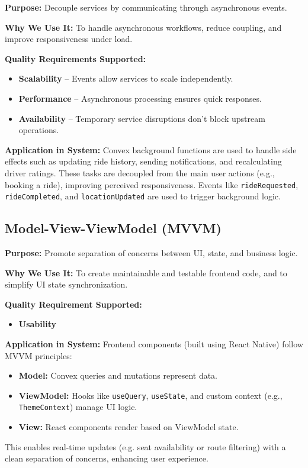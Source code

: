 \documentclass[12pt]{article}
\begin{document}
\textbf{Purpose:} Decouple services by communicating through asynchronous events.

\textbf{Why We Use It:} To handle asynchronous workflows, reduce coupling, and improve responsiveness under load.

\textbf{Quality Requirements Supported:}
\begin{itemize}
  \item \textbf{Scalability} – Events allow services to scale independently.
  \item \textbf{Performance} – Asynchronous processing ensures quick responses.
  \item \textbf{Availability} – Temporary service disruptions don't block upstream operations.
\end{itemize}

\textbf{Application in System:}  
Convex background functions are used to handle side effects such as updating ride history, sending notifications, and recalculating driver ratings. These tasks are decoupled from the main user actions (e.g., booking a ride), improving perceived responsiveness. Events like \texttt{rideRequested}, \texttt{rideCompleted}, and \texttt{locationUpdated} are used to trigger background logic.

\subsection{Model-View-ViewModel (MVVM)}

\textbf{Purpose:} Promote separation of concerns between UI, state, and business logic.

\textbf{Why We Use It:} To create maintainable and testable frontend code, and to simplify UI state synchronization.

\textbf{Quality Requirement Supported:} 
\begin{itemize}
   \item \textbf{Usability}
\end{itemize}  

\textbf{Application in System:}  
Frontend components (built using React Native) follow MVVM principles:
\begin{itemize}
  \item \textbf{Model:} Convex queries and mutations represent data.
  \item \textbf{ViewModel:} Hooks like \texttt{useQuery}, \texttt{useState}, and custom context (e.g., \texttt{ThemeContext}) manage UI logic.
  \item \textbf{View:} React components render based on ViewModel state.
\end{itemize}
This enables real-time updates (e.g. seat availability or route filtering) with a clean separation of concerns, enhancing user experience.
\end{document}
